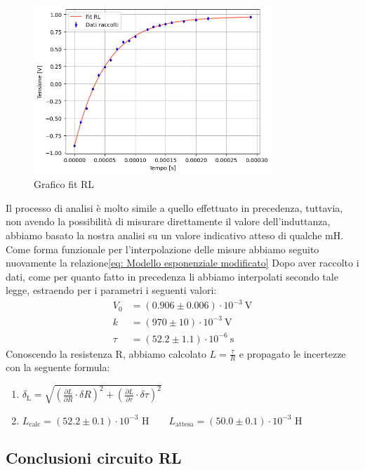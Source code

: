 \documentclass[letterpaper,12pt]{article}
\begin{document}
\begin{figure}[h] 
  \centering
  \includegraphics[width=0.8\textwidth]{RL.png} %
  \caption{Grafico fit RL}
  \label{fig:fitRL}
\end{figure} 
Il processo di analisi è molto simile a quello effettuato in precedenza, tuttavia, non avendo la possibilità di misurare direttamente il valore dell'induttanza, abbiamo basato la nostra analisi su un valore indicativo atteso di qualche mH.\\
Come forma funzionale per l'interpolazione delle misure abbiamo seguito nuovamente la relazione\eqref{eq: Modello esponenziale modificato}
Dopo aver raccolto i dati, come per quanto fatto in precedenza li abbiamo interpolati secondo tale legge, estraendo per i parametri i seguenti valori:
\begin{align*}
    V_0 &= ( 0.906\pm0.006 )\cdot 10^{-3}\ \text{V} \\
    k &= (970 \pm 10)\cdot 10^{-3}\ \text{V} \\
    \tau &= (52.2 \pm 1.1) \cdot 10^{-6}\ \text{s} 
\end{align*} 
Conoscendo la resistenza R, abbiamo calcolato $L = \frac{\tau}{R}$ e propagato le incertezze con la seguente formula:
\begin{enumerate}
    \item $\delta_\text{L} = \sqrt{(\frac{\partial L}{\partial R} \cdot \delta R)^2 + (\frac{\partial L}{\partial \tau}\cdot \delta \tau)^2} $
    \item $ L_\text{calc}= (52.2 \pm 0.1) \cdot 10^{-3} \text{ H} \qquad L_\text{attesa}= (50.0 \pm 0.1) \cdot 10^{-3} \text{ H}$
\end{enumerate}

\subsection{Conclusioni circuito RL}
\end{document}
